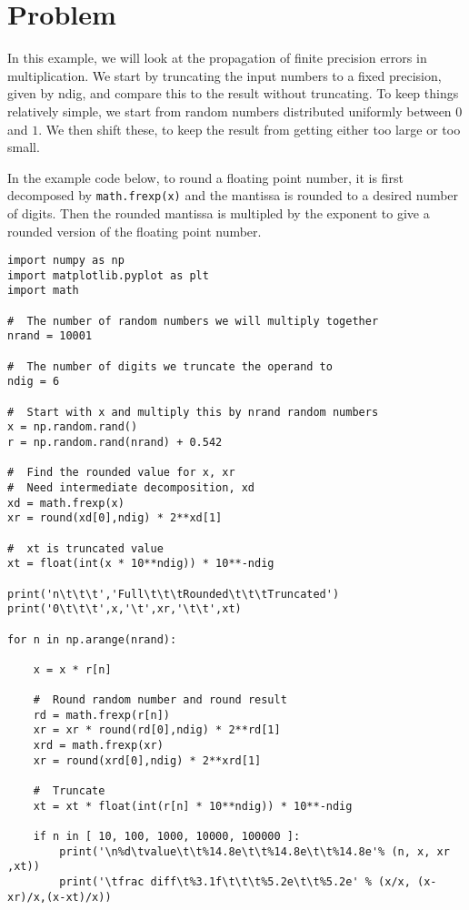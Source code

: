 \section{Problem \thesection}\label{sec:p1}

In this example, we will look at the propagation of finite precision errors in
multiplication. We start by truncating the input numbers to a fixed precision, given by
ndig, and compare this to the result without truncating. To keep things relatively simple,
we start from random numbers distributed uniformly between $0$ and $1$. We then shift these,
to keep the result from getting either too large or too small.

In the example code below, to round a floating point number, it is first decomposed by
\texttt{math.frexp(x)} and the mantissa is rounded to a desired number of digits. Then the
rounded mantissa is multipled by the exponent to give a rounded version of the floating
point number.

\begin{verbatim}
import numpy as np
import matplotlib.pyplot as plt
import math

#  The number of random numbers we will multiply together
nrand = 10001

#  The number of digits we truncate the operand to
ndig = 6

#  Start with x and multiply this by nrand random numbers
x = np.random.rand()
r = np.random.rand(nrand) + 0.542

#  Find the rounded value for x, xr
#  Need intermediate decomposition, xd
xd = math.frexp(x)
xr = round(xd[0],ndig) * 2**xd[1]

#  xt is truncated value
xt = float(int(x * 10**ndig)) * 10**-ndig

print('n\t\t\t','Full\t\t\tRounded\t\t\tTruncated')
print('0\t\t\t',x,'\t',xr,'\t\t',xt)

for n in np.arange(nrand):

    x = x * r[n]

    #  Round random number and round result
    rd = math.frexp(r[n])
    xr = xr * round(rd[0],ndig) * 2**rd[1]
    xrd = math.frexp(xr)
    xr = round(xrd[0],ndig) * 2**xrd[1]

    #  Truncate
    xt = xt * float(int(r[n] * 10**ndig)) * 10**-ndig

    if n in [ 10, 100, 1000, 10000, 100000 ]:
        print('\n%d\tvalue\t\t%14.8e\t\t%14.8e\t\t%14.8e'% (n, x, xr ,xt))
        print('\tfrac diff\t%3.1f\t\t\t%5.2e\t\t%5.2e' % (x/x, (x-xr)/x,(x-xt)/x))
\end{verbatim}

